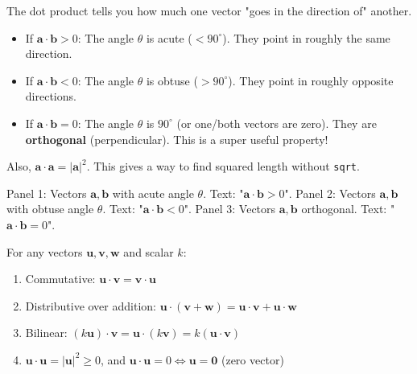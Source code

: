 \begin{intuition}
\label{intuition:A.1.1.dot_product}
The dot product tells you how much one vector "goes in the direction of" another.
\begin{itemize}
    \item If $\mathbf{a} \cdot \mathbf{b} > 0$: The angle $\theta$ is acute ($< 90^\circ$). They point in roughly the same direction.
    \item If $\mathbf{a} \cdot \mathbf{b} < 0$: The angle $\theta$ is obtuse ($> 90^\circ$). They point in roughly opposite directions.
    \item If $\mathbf{a} \cdot \mathbf{b} = 0$: The angle $\theta$ is $90^\circ$ (or one/both vectors are zero). They are \textbf{orthogonal} (perpendicular). This is a super useful property!
\end{itemize}
Also, $\mathbf{a} \cdot \mathbf{a} = |\mathbf{a}|^2$. This gives a way to find squared length without \texttt{sqrt}.
\end{intuition}

\begin{visualexample}
\label{vis:A.1.1.dot_product_cases}
Panel 1: Vectors $\mathbf{a}, \mathbf{b}$ with acute angle $\theta$. Text: "$\mathbf{a} \cdot \mathbf{b} > 0$".
Panel 2: Vectors $\mathbf{a}, \mathbf{b}$ with obtuse angle $\theta$. Text: "$\mathbf{a} \cdot \mathbf{b} < 0$".
Panel 3: Vectors $\mathbf{a}, \mathbf{b}$ orthogonal. Text: "$\mathbf{a} \cdot \mathbf{b} = 0$".
\end{visualexample}

\begin{theorem}
\label{thm:A.1.1.dot_product_props}
For any vectors $\mathbf{u}, \mathbf{v}, \mathbf{w}$ and scalar $k$:
\begin{enumerate}
    \item Commutative: $\mathbf{u} \cdot \mathbf{v} = \mathbf{v} \cdot \mathbf{u}$
    \item Distributive over addition: $\mathbf{u} \cdot (\mathbf{v} + \mathbf{w}) = \mathbf{u} \cdot \mathbf{v} + \mathbf{u} \cdot \mathbf{w}$
    \item Bilinear: $(k\mathbf{u}) \cdot \mathbf{v} = \mathbf{u} \cdot (k\mathbf{v}) = k(\mathbf{u} \cdot \mathbf{v})$
    \item $\mathbf{u} \cdot \mathbf{u} = |\mathbf{u}|^2 \ge 0$, and $\mathbf{u} \cdot \mathbf{u} = 0 \iff \mathbf{u} = \mathbf{0}$ (zero vector)
\end{enumerate}
\end{theorem}

